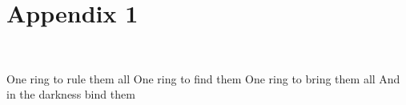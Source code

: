 \documentclass[11pt]{article}
\begin{document}



 \section{Appendix 1}
 
\begin{minipage}[t]{0.5\textwidth}
 \tengwarannataritalic[1.09]
 \Textendedcalma\TTthreedots\Tnuumen\Tessenuquerna\TTthreedots\Tungwe\Tando\Toore\TTrightcurl\Tumbar\Ttinco\TTthreedots\Tlambealt\TTrightcurl\Tquesse\TTdoublerightcurl
 \Tromanperiod\Ts
 \Textendedcalma\TTthreedots\Tnuumen\Tessenuquerna\TTthreedots\Tungwe\Tungwe\Tumbar\TTnasalizer\TTdot\Ttinco\TTthreedots\Tlambe\TTrightcurl
 \\
 \Textendedcalma\TTthreedots\Tnuumen\Tessenuquerna\TTthreedots\Tungwe\Tthuule\Troomen\Tquesse\TTthreedots\Ttinco\TTthreedots\Tlambealt\TTrightcurl\Tquesse\TTdoublerightcurl
 \Tromanperiod\Ts
 \Textendedungwe\TTthreedots\Tumbar\Toore\TTrightcurl\Tesse{}\Tmalta\TTrightcurl\Textendedcalma\TTdot\Ttelco\TTdot\Tquesse\Troomen\Tparma\TTnasalizer\TTdot\Ttinco\TTthreedots\Tlambe\TTrightcurl
 \newline
\end{minipage}
\begin{minipage}[t]{0.5\textwidth}
 One ring to rule them all \newline
 One ring to find them \newline
 One ring to bring them all \newline
 And in the darkness bind them
\end{minipage}

\end{document}
